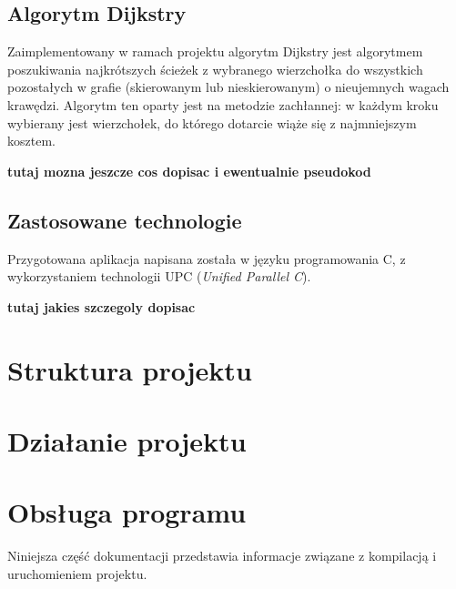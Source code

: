 \documentclass[12pt]{article}
\begin{document}
\subsection{Algorytm Dijkstry}
Zaimplementowany w ramach projektu algorytm Dijkstry jest algorytmem poszukiwania najkrótszych ścieżek z wybranego wierzchołka do wszystkich pozostałych w grafie (skierowanym lub nieskierowanym) o nieujemnych wagach krawędzi. Algorytm ten oparty jest na metodzie zachłannej: w każdym kroku wybierany jest wierzchołek, do którego dotarcie wiąże się z najmniejszym kosztem.

\textbf{tutaj mozna jeszcze cos dopisac i ewentualnie pseudokod}


\subsection{Zastosowane technologie}
Przygotowana aplikacja napisana została w języku programowania C, z wykorzystaniem technologii UPC (\textit{Unified Parallel C}). 

\textbf{tutaj jakies szczegoly dopisac}


\clearpage
\section{Struktura projektu}

\clearpage
\section{Działanie projektu}

\clearpage
\section{Obsługa programu}
Niniejsza część dokumentacji przedstawia informacje związane z kompilacją i uruchomieniem projektu.
\end{document}
